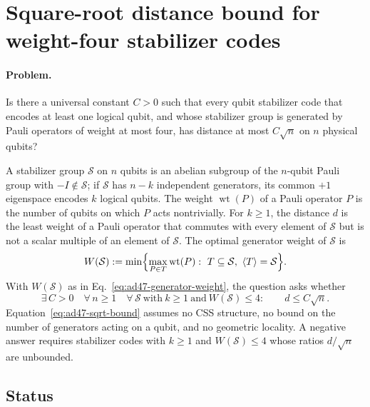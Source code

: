 \section{Square-root distance bound for weight-four stabilizer codes}
\label{sec:op_ad474bf3083462b6}

\paragraph{Problem.}
Is there a universal constant $C>0$ such that every qubit stabilizer code that encodes at least one logical qubit, and whose stabilizer group is generated by Pauli operators of weight at most four, has distance at most $C\sqrt n$ on $n$ physical qubits?

A stabilizer group $\mathcal S$ on $n$ qubits is an abelian subgroup of the $n$-qubit Pauli group with $-I\notin\mathcal S$; if $\mathcal S$ has $n-k$ independent generators, its common $+1$ eigenspace encodes $k$ logical qubits. The weight $\operatorname{wt}(P)$ of a Pauli operator $P$ is the number of qubits on which $P$ acts nontrivially. For $k\geq1$, the distance $d$ is the least weight of a Pauli operator that commutes with every element of $\mathcal S$ but is not a scalar multiple of an element of $\mathcal S$. The optimal generator weight of $\mathcal S$ is
\begin{equation}
  W(\mathcal S):=\min\Bigl\{\max_{P\in T}\operatorname{wt}(P):\ T\subseteq\mathcal S,\ \langle T\rangle=\mathcal S\Bigr\}.
  \label{eq:ad47-generator-weight}
\end{equation}
With $W(\mathcal S)$ as in Eq.~\eqref{eq:ad47-generator-weight}, the question asks whether
\begin{equation}
  \exists\,C>0\quad\forall\,n\geq1\quad\forall\,\mathcal S\ \text{with}\ k\geq1\ \text{and}\ W(\mathcal S)\leq4:\qquad d\leq C\sqrt n.
  \label{eq:ad47-sqrt-bound}
\end{equation}
Equation~\eqref{eq:ad47-sqrt-bound} assumes no CSS structure, no bound on the number of generators acting on a qubit, and no geometric locality. A negative answer requires stabilizer codes with $k\geq1$ and $W(\mathcal S)\leq4$ whose ratios $d/\sqrt n$ are unbounded.

\subsection*{Status}

